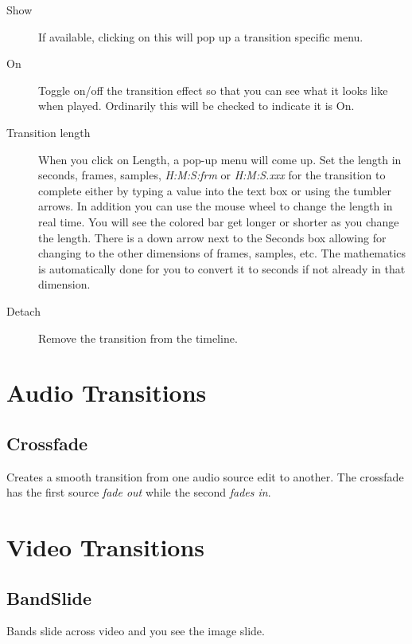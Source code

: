 \begin{description}
    \item[Show] If available, clicking on this will pop up a transition specific menu.
    \item[On] Toggle on/off the transition effect so that you can see what it looks like when played. Ordinarily this will be checked to indicate it is On.
    \item[Transition length] When you click on Length, a pop-up menu will come up.  Set the length in seconds, frames, samples, \textit{H:M:S:frm} or \textit{H:M:S.xxx} for the transition to complete either by typing a value into the text box or using the tumbler arrows.  In addition you can use the mouse wheel to change the length in real time. You will see the colored bar get longer or shorter as you change the length. 
There is a down arrow next to the Seconds box allowing for changing to the other dimensions of frames, samples, etc.  The mathematics is automatically done for you to convert it to seconds if not already in that dimension.
    \item[Detach] Remove the transition from the timeline.
\end{description}

\section{Audio Transitions}%
\label{sec:audio_transition}

\subsection*{Crossfade}%
\label{sub:crossfade}

Creates a smooth transition from one audio source edit to another. The crossfade has the first source \textit{fade out} while the second \textit{fades in}.

\section{Video Transitions}%
\label{sec:video_transition}

\subsection*{BandSlide}%
\label{sub:bandslide}

Bands slide across video and you see the image slide.

